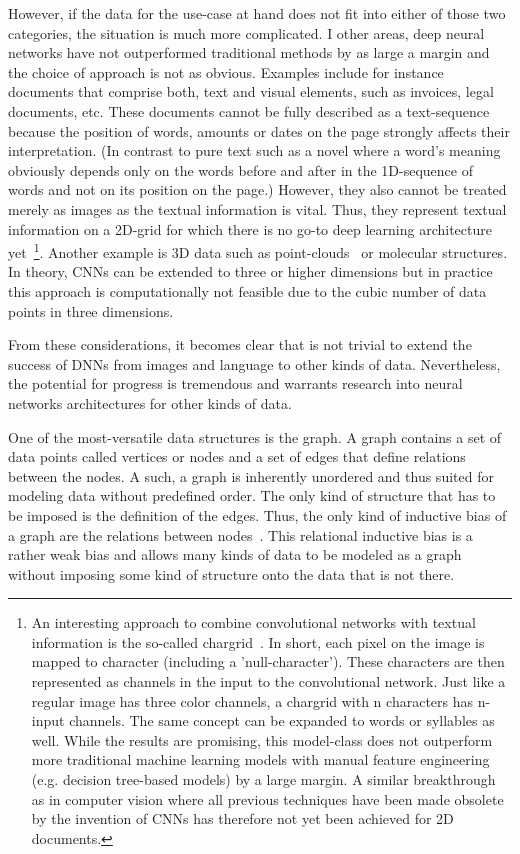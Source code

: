 However, if the data for the use-case at hand does not fit into either of those two categories, the situation is much more complicated. I other areas, deep neural networks have not outperformed traditional methods by as large a margin and the choice of approach is not as obvious. Examples include for instance documents that comprise both, text and visual elements, such as invoices, legal documents, etc. These documents cannot be fully described as a text-sequence because the position of words, amounts or dates on the page strongly affects their interpretation. (In contrast to pure text such as a novel where a word's meaning obviously depends only on the words before and after in the 1D-sequence of words and not on its position on the page.) However, they also cannot be treated merely as images as the textual information is vital. Thus, they represent textual information on a 2D-grid for which there is no go-to deep learning architecture yet~\footnote{
	An interesting approach to combine convolutional networks with textual information is the so-called chargrid~\cite{Katti2020}. In short, each pixel on the image is mapped to character (including a 'null-character'). These characters are then represented as channels in the input to the convolutional network. Just like a regular image has three color channels, a chargrid with n characters has n-input channels. The same concept can be expanded to words or syllables as well. While the results are promising, this model-class does not outperform more traditional machine learning models with manual feature engineering (e.g. decision tree-based models) by a large margin. A similar breakthrough as in computer vision where all previous techniques have been made obsolete by the invention of CNNs has therefore not yet been achieved for 2D documents.
}. Another example is 3D data such as point-clouds~\cite{Charles2017} or molecular structures. In theory, CNNs can be extended to three or higher dimensions but in practice this approach is computationally not feasible due to the cubic number of data points in three dimensions.

From these considerations, it becomes clear that is not trivial to extend the success of DNNs from images and language to other kinds of data. Nevertheless, the potential for progress is tremendous and warrants research into neural networks architectures for other kinds of data.

One of the most-versatile data structures is the graph. A graph contains a set of data points called vertices or nodes and a set of edges that define relations between the nodes. A such, a graph is inherently unordered and thus suited for modeling data without predefined order. The only kind of structure that has to be imposed is the definition of the edges. Thus, the only kind of inductive bias of a graph are the relations between nodes~\cite{Battaglia2018}. This relational inductive bias is a rather weak bias and allows many kinds of data to be modeled as a graph without imposing some kind of structure onto the data that is not there.

